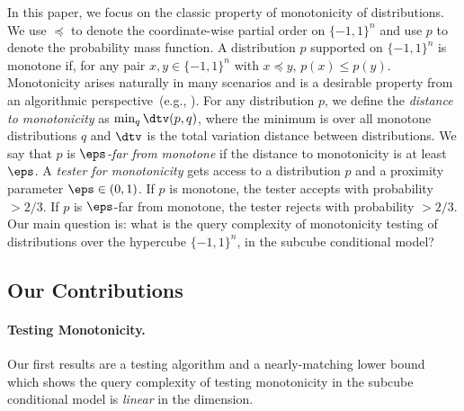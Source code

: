 In this paper, we focus on the classic property of monotonicity of distributions. We use $\preceq$ to denote the coordinate-wise partial order on $\{-1,1\}^n$ and use $p$ to denote the probability mass function.
A distribution $p$ supported on $\{-1,1\}^n$ is monotone if, for any pair $x, y \in \{-1,1\}^n$ with $x \preceq y$, 
$p(x) \leq p(y)$. 
Monotonicity arises naturally in many scenarios and is a desirable property from an algorithmic perspective~(e.g., \cite{BLMT23}). 
For any distribution $p$, we define the \emph{distance to monotonicity} as $\min_{q } \dtv(p,q)$, 
where the minimum is over all monotone distributions $q$ and $\dtv$ is the total variation distance between distributions. We say that $p$ is \emph{$\eps$-far from monotone}
if the distance to monotonicity is at least $\eps$.
A \emph{tester for monotonicity} gets access to a distribution $p$ and a proximity parameter $\eps \in (0,1)$. 
If $p$ is monotone, the tester accepts with probability $> 2/3$. If $p$ is $\eps$-far from monotone,
the tester rejects with probability $> 2/3$.
Our main question is: what is the query complexity of monotonicity testing of distributions over the hypercube $\{-1,1\}^n$, in the subcube conditional model?



% 
% 
% 

\subsection{Our Contributions} \label{sec:contributions}

\paragraph{Testing Monotonicity.} Our first results are a testing algorithm and a nearly-matching lower bound which shows the query complexity of testing monotonicity in the subcube conditional model is \emph{linear} in the dimension.

